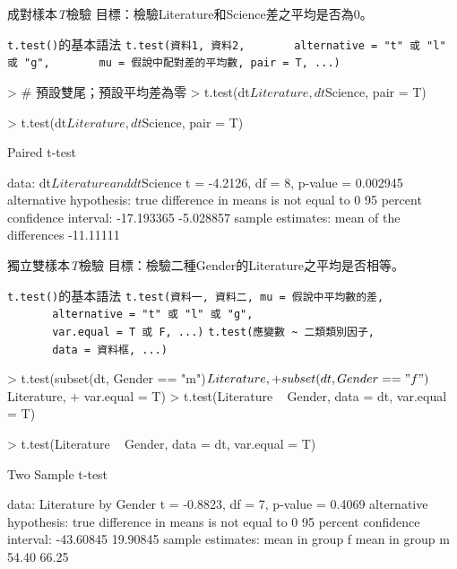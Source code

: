 \documentclass[14pt, aspectratio=43]{beamer}
\begin{document}
\begin{frame}{成對樣本\emph{T}檢驗}
目標：檢驗Literature和Science差之平均是否為0。
\begin{block}{\texttt{t.test()}的基本語法}
\verb+t.test(資料1, 資料2,+
\verb+       alternative = "t" 或 "l" 或 "g",+
\verb+       mu = 假說中配對差的平均數, pair = T, ...)+
\end{block}
\begin{RC}
> # 預設雙尾；預設平均差為零
> t.test(dt$Literature, dt$Science, pair = T)
\end{RC}

\framebreak

\begin{RC}
> t.test(dt$Literature, dt$Science, pair = T)
\end{RC}
\begin{R}
	Paired t-test

data:  dt$Literature and dt$Science
t = -4.2126, df = 8, p-value = 0.002945
alternative hypothesis: true difference in means is not equal to 0
95 percent confidence interval:
 -17.193365  -5.028857
sample estimates:
mean of the differences 
              -11.11111 
\end{R}
\end{frame}


\begin{frame}{獨立雙樣本\emph{T}檢驗}
目標：檢驗二種Gender的Literature之平均是否相等。
\begin{block}{\texttt{t.test()}的基本語法}
\verb+t.test(資料一, 資料二, mu = 假說中平均數的差,+\\
\verb+       alternative = "t" 或 "l" 或 "g",+\\
\verb+       var.equal = T 或 F, ...)+
\verb+t.test(應變數 ~ 二類類別因子,+\\
\verb+       data = 資料框, ...)+
\end{block}
\begin{RC}
> t.test(subset(dt, Gender == "m")$Literature,
+        subset(dt, Gender == "f")$Literature,
+        var.equal = T)
> t.test(Literature ~ Gender, data = dt, var.equal = T)
\end{RC}

\framebreak

\begin{RC}
> t.test(Literature ~ Gender, data = dt, var.equal = T)
\end{RC}
\begin{R}
	Two Sample t-test

data:  Literature by Gender
t = -0.8823, df = 7, p-value = 0.4069
alternative hypothesis: true difference in means is not equal to 0
95 percent confidence interval:
 -43.60845  19.90845
sample estimates:
mean in group f mean in group m 
          54.40           66.25 
\end{R}
\end{frame}
\end{document}
